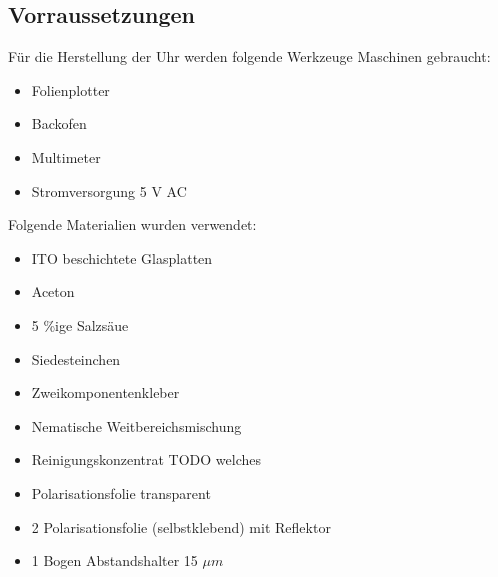 \subsection{Vorraussetzungen}
Für die Herstellung der Uhr werden folgende Werkzeuge Maschinen gebraucht:
\begin{itemize}
\item Folienplotter
\item Backofen
\item Multimeter
\item Stromversorgung 5 V AC

\end{itemize}
Folgende Materialien wurden verwendet:
\begin{itemize}
\item ITO beschichtete Glasplatten
\item Aceton
\item 5 \%ige Salzsäue
\item Siedesteinchen
\item Zweikomponentenkleber
\item Nematische Weitbereichsmischung
\item Reinigungskonzentrat TODO welches
\item Polarisationsfolie transparent
\item 2 Polarisationsfolie (selbstklebend) mit Reflektor
\item 1 Bogen Abstandshalter 15 \(\mu m\)
\end{itemize}